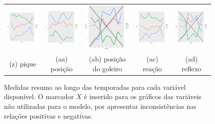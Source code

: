 \documentclass[review]{elsarticle}
\begin{document}
\begin{figure}[!bp]
\begin{tabular}{ccccc}
    \includegraphics[width=25mm]{pique_result}  & \includegraphics[width=25mm]{pos_result} & \includegraphics[width=25mm]{posicion_gl_result} &     \includegraphics[width=25mm]{reacao_result}&
  \includegraphics[width=25mm]{reflexos_result}     \\
 \scriptsize{(z) pique} & \scriptsize{(aa) posição}& \scriptsize{(ab) posição do goleiro} & \scriptsize{(ac) reação} & \scriptsize{(ad) reflexo}  \\[3pt]

\end{tabular}
    \caption[\scriptsize{Medidas resumo.}]{\scriptsize{Medidas resumo ao longo das temporadas para cada variável disponível. O marcador $X$ é inserido para os gráficos das variáveis não utilizadas para o modelo, por apresentar inconsistências nas relações positivas e negativas.}}
        \label{fig:medresumo}
\end{figure}
\end{document}
